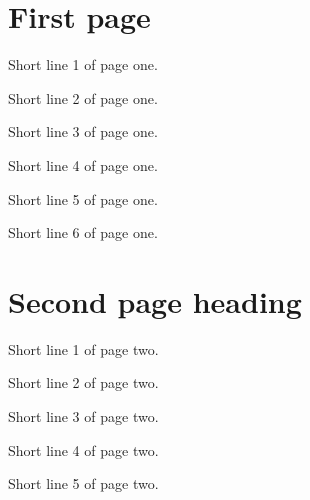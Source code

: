 \section{First page}
Short line 1 of page one.\par
Short line 2 of page one.\par
Short line 3 of page one.\par
Short line 4 of page one.\par
Short line 5 of page one.\par
Short line 6 of page one.\par
\clearpage
\section{Second page heading}
Short line 1 of page two.\par
Short line 2 of page two.\par
Short line 3 of page two.\par
Short line 4 of page two.\par
Short line 5 of page two.\par

